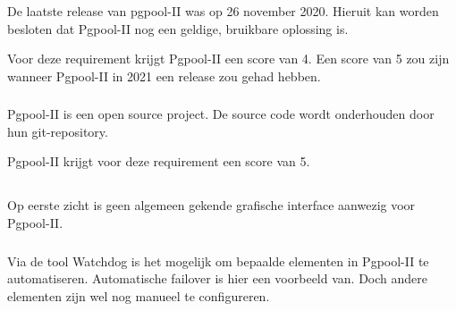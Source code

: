 De laatste release van pgpool-II was op 26 november 2020. Hieruit kan worden besloten dat Pgpool-II nog een geldige, bruikbare oplossing is.

Voor deze requirement krijgt Pgpool-II een score van 4. Een score van 5 zou zijn wanneer Pgpool-II in 2021 een release zou gehad hebben.

\subsubsection{}
\label{subsubsec:Open source}

Pgpool-II is een open source project. De source code wordt onderhouden door hun git-repository.

Pgpool-II krijgt voor deze requirement een score van 5.

\subsection{}
\label{subsec:Could have}


\subsubsection{}
\label{subsubsec:Grafische interface}

Op eerste zicht is geen algemeen gekende grafische interface aanwezig voor Pgpool-II.

\subsubsection{}
\label{subsubsec:Beperkte manuele interventie}

Via de tool Watchdog is het mogelijk om bepaalde elementen in Pgpool-II te automatiseren. Automatische failover is hier een voorbeeld van. Doch andere elementen zijn wel nog manueel te configureren.
